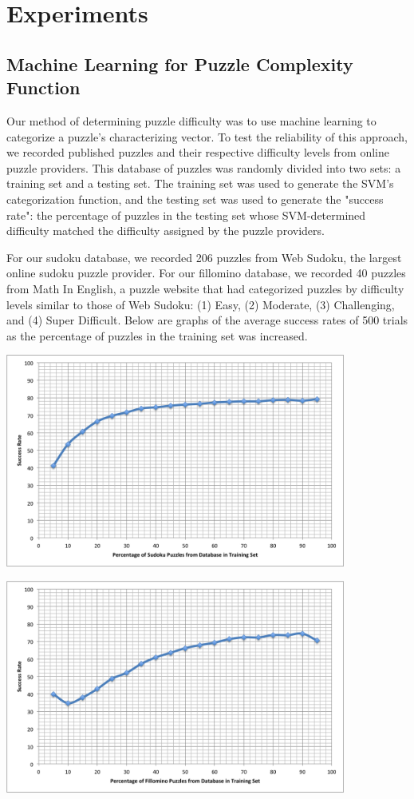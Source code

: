 \section{Experiments}

\subsection{Machine Learning for Puzzle Complexity Function}

Our method of determining puzzle difficulty was to use machine learning to categorize a puzzle's characterizing vector. To test the reliability of this approach, we recorded published puzzles and their respective difficulty levels from online puzzle providers. This database of puzzles was randomly divided into two sets: a training set and a testing set. The training set was used to generate the SVM's categorization function, and the testing set was used to generate the "success rate": the percentage of puzzles in the testing set whose SVM-determined difficulty matched the difficulty assigned by the puzzle providers. 

For our sudoku database, we recorded 206 puzzles from Web Sudoku, the largest online sudoku puzzle provider. For our fillomino database, we recorded 40 puzzles from Math In English, a puzzle website that had categorized puzzles by difficulty levels similar to those of Web Sudoku: (1) Easy, (2) Moderate, (3) Challenging, and (4) Super Difficult. Below are graphs of the average success rates of 500 trials as the percentage of puzzles in the training set was increased.  

\centerline{\includegraphics[height = 7cm]{SudokuDifficulty.png}}

\centerline{\includegraphics[height = 7cm]{FillominoDifficulty.png}}

